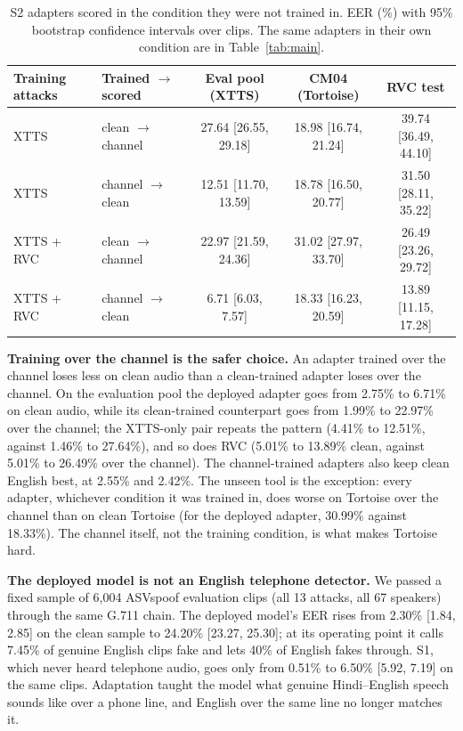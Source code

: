 \begin{table}[t]
\centering
\caption{S2 adapters scored in the condition they were not trained in. EER (\%) with
95\% bootstrap confidence intervals over clips. The same adapters in their own
condition are in Table~\ref{tab:main}.}
\label{tab:tradeoff}
\small
\begin{tabular}{@{}llccc@{}}
\toprule
Training attacks & Trained $\rightarrow$ scored & Eval pool (XTTS) & CM04 (Tortoise) & RVC test \\
\midrule
XTTS       & clean $\rightarrow$ channel & 27.64 {\scriptsize[26.55, 29.18]} & 18.98 {\scriptsize[16.74, 21.24]} & 39.74 {\scriptsize[36.49, 44.10]} \\
XTTS       & channel $\rightarrow$ clean & 12.51 {\scriptsize[11.70, 13.59]} & 18.78 {\scriptsize[16.50, 20.77]} & 31.50 {\scriptsize[28.11, 35.22]} \\
XTTS + RVC & clean $\rightarrow$ channel & 22.97 {\scriptsize[21.59, 24.36]} & 31.02 {\scriptsize[27.97, 33.70]} & 26.49 {\scriptsize[23.26, 29.72]} \\
XTTS + RVC & channel $\rightarrow$ clean & 6.71 {\scriptsize[6.03, 7.57]}    & 18.33 {\scriptsize[16.23, 20.59]} & 13.89 {\scriptsize[11.15, 17.28]} \\
\bottomrule
\end{tabular}
\end{table}

\textbf{Training over the channel is the safer choice.} An adapter trained over the
channel loses less on clean audio than a clean-trained adapter loses over the
channel. On the evaluation pool the deployed adapter goes from 2.75\% to 6.71\% on
clean audio, while its clean-trained counterpart goes from 1.99\% to 22.97\% over the
channel; the XTTS-only pair repeats the pattern (4.41\% to 12.51\%, against 1.46\% to
27.64\%), and so does RVC (5.01\% to 13.89\% clean, against 5.01\% to 26.49\% over
the channel). The channel-trained adapters also keep clean English best, at 2.55\% and
2.42\%. The unseen tool is the exception: every adapter, whichever condition it was
trained in, does worse on Tortoise over the channel than on clean Tortoise (for the
deployed adapter, 30.99\% against 18.33\%). The channel itself, not the training
condition, is what makes Tortoise hard.

\textbf{The deployed model is not an English telephone detector.} We passed a fixed
sample of 6,004 ASVspoof evaluation clips (all 13 attacks, all 67 speakers) through
the same G.711 chain. The deployed model's EER rises from 2.30\% {\scriptsize[1.84,
2.85]} on the clean sample to 24.20\% {\scriptsize[23.27, 25.30]}; at its operating
point it calls 7.45\% of genuine English clips fake and lets 40\% of English fakes
through. S1, which never heard telephone audio, goes only from 0.51\% to 6.50\%
{\scriptsize[5.92, 7.19]} on the same clips. Adaptation taught the model what genuine
Hindi--English speech sounds like over a phone line, and English over the same line
no longer matches it.


